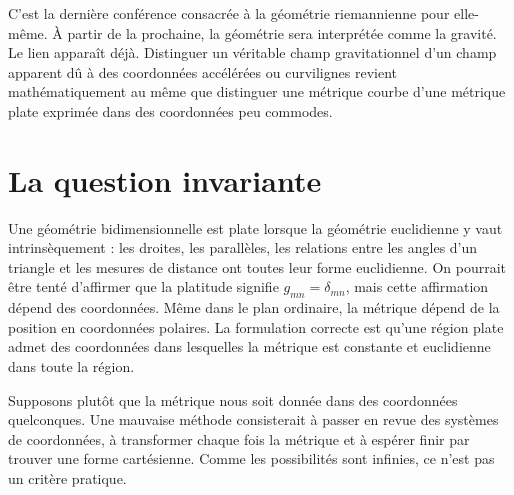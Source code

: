 \begin{classroomqa}
\end{classroomqa}

C’est la dernière conférence consacrée à la géométrie riemannienne pour elle-même. À partir de la prochaine, la géométrie sera interprétée comme la gravité. Le lien apparaît déjà. Distinguer un véritable champ gravitationnel d’un champ apparent dû à des coordonnées accélérées ou curvilignes revient mathématiquement au même que distinguer une métrique courbe d’une métrique plate exprimée dans des coordonnées peu commodes.

\section{La question invariante}

Une géométrie bidimensionnelle est plate lorsque la géométrie euclidienne y vaut intrinsèquement : les droites, les parallèles, les relations entre les angles d’un triangle et les mesures de distance ont toutes leur forme euclidienne. On pourrait être tenté d’affirmer que la platitude signifie \(g_{mn}=\delta_{mn}\), mais cette affirmation dépend des coordonnées. Même dans le plan ordinaire, la métrique dépend de la position en coordonnées polaires. La formulation correcte est qu’une région plate admet des coordonnées dans lesquelles la métrique est constante et euclidienne dans toute la région.

Supposons plutôt que la métrique nous soit donnée dans des coordonnées quelconques. Une mauvaise méthode consisterait à passer en revue des systèmes de coordonnées, à transformer chaque fois la métrique et à espérer finir par trouver une forme cartésienne. Comme les possibilités sont infinies, ce n’est pas un critère pratique.

